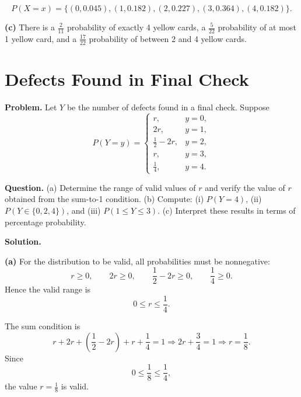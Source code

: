 \[
		P(X=x)=\{(0,0.045),(1,0.182),(2,0.227),(3,0.364),(4,0.182)\}.
		\]
\begin{center}
		\end{center}
\textbf{(c)} There is a $\frac{2}{11}$ probability of exactly 4 yellow cards, a $\frac{5}{22}$ probability of at most 1 yellow card, and a $\frac{17}{22}$ probability of between 2 and 4 yellow cards.
		
		
		
		\section{Defects Found in Final Check}
		
			\textbf{Problem.}
		Let $Y$ be the number of defects found in a final check. Suppose
		\[
		P(Y=y)=\begin{cases}
			r, & y=0,\\
			2r, & y=1,\\
			\frac{1}{2}-2r, & y=2,\\
			r, & y=3,\\
			\frac{1}{4}, & y=4.
		\end{cases}
		\]
		
		\textbf{Question.}
		(a) Determine the range of valid values of $r$ and verify the value of $r$ obtained from the sum-to-1 condition.
		(b) Compute: (i) $P(Y=4)$, (ii) $P(Y\in\{0,2,4\})$, and (iii) $P(1\le Y\le 3)$.
		(c) Interpret these results in terms of percentage probability.
		
		\textbf{Solution.}

		\textbf{(a)} For the distribution to be valid, all probabilities must be nonnegative:
		\[
		r\ge 0,\qquad 2r\ge 0,\qquad \frac{1}{2}-2r\ge 0,\qquad \frac{1}{4}\ge 0.
		\]
		Hence the valid range is
		\[
		0\le r\le \frac{1}{4}.
		\]
		
		The sum condition is
		\[
		r+2r+\left(\frac{1}{2}-2r\right)+r+\frac{1}{4}=1
		\Rightarrow 2r+\frac{3}{4}=1
		\Rightarrow r=\frac{1}{8}.
		\]
		Since
		\[
		0\le \frac{1}{8}\le \frac{1}{4},
		\]
		the value $r=\frac{1}{8}$ is valid.
		

